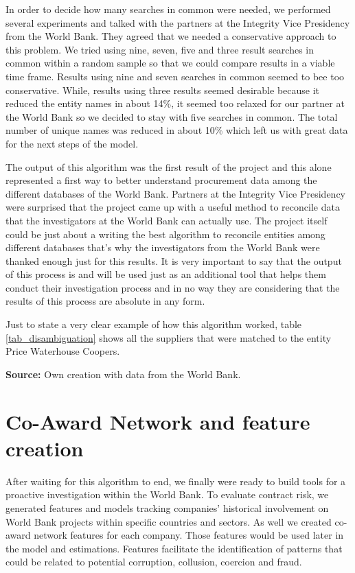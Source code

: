 In order to decide how many searches in common were needed, we performed several experiments and talked with the partners at the Integrity Vice Presidency from the World Bank. They agreed that we needed a conservative approach to this problem. We tried using  nine, seven, five and three result searches in common within a random sample so that we could compare results in a viable time frame. Results using nine and seven searches in common seemed to bee too conservative. While, results using three results seemed desirable because it reduced the entity names in about 14\%, it seemed too relaxed for our partner at the World Bank so we decided to stay with five searches in common.  The total number of unique names was reduced in about 10\% which left us with great data for the next steps of the model.

The output of this algorithm was the first result of the project and this alone represented a first way to better understand procurement data among the different databases of the World Bank. Partners at the Integrity Vice Presidency were surprised that the project came up with a useful method to reconcile data that the investigators at the World Bank can actually use. The project itself could be just about a writing the best algorithm to reconcile entities among different databases that's why the investigators from the World Bank were thanked enough just for this results. It is very important to say that the output of this process is and will be used just as an additional tool that helps them  conduct their investigation process and in no way they are considering that the results of this process are absolute in any form.

Just to state a very clear example of how this algorithm worked, table	\ref{tab_disambiguation} shows all the suppliers that were matched to the entity Price Waterhouse Coopers.


\noindent \footnotesize{\textbf{Source:} Own creation with data from the World Bank.}


\section{Co-Award Network and feature creation} \label{sec_features}


After waiting for this algorithm to end, we finally were ready to build tools for a proactive investigation within the World Bank. To evaluate contract risk, we generated features and models tracking companies' historical involvement on World Bank projects within specific countries and sectors. As well we created co-award network features for each company.  Those features would be used later in the model and estimations. Features facilitate the identification of patterns that could be related to potential corruption, collusion, coercion and fraud.

